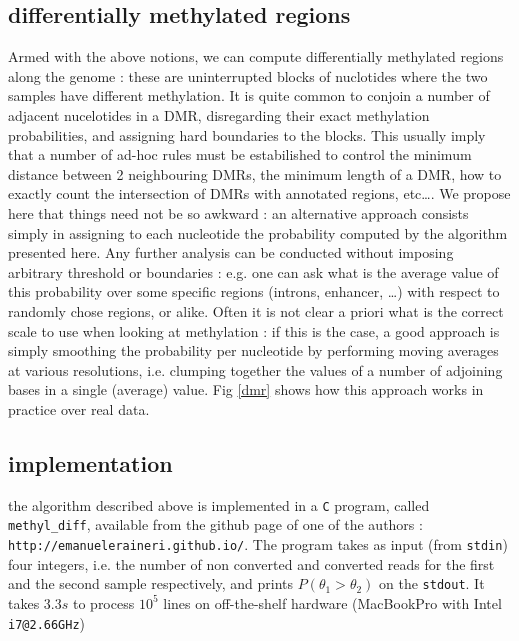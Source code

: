 \documentclass[11pt]{amsart}
\begin{document}
\subsection{differentially methylated regions}
Armed with the above notions, we can compute differentially methylated regions along the genome : these are uninterrupted blocks of nuclotides where the two samples have different methylation. It is quite common to conjoin a number of adjacent nucelotides in a DMR, disregarding their exact methylation probabilities, and assigning hard boundaries to the blocks. This usually imply that a number of ad-hoc rules must be estabilished to control the minimum distance between 2 neighbouring DMRs, the minimum length of a DMR, how to exactly count the intersection of DMRs with annotated regions, etc\dots. We propose here that things need not be so awkward : an alternative approach consists simply in assigning to each nucleotide the probability computed by the algorithm presented here. Any further analysis can be conducted without imposing arbitrary threshold or boundaries : e.g. one can ask what is the average value of this probability over some specific regions (introns, enhancer, \dots) with respect to randomly chose regions, or alike. Often it is not clear a priori what is the correct scale to use when looking at methylation : if this is the case, a good approach is simply smoothing the probability per nucleotide by performing moving averages at various resolutions, i.e. clumping together the values of a number of adjoining bases in a single (average) value. Fig \ref{dmr} shows how this approach works in practice over real data.
\subsection{implementation}
the algorithm described above is implemented in a \verb=C= program, called \verb=methyl_diff=, available from the github page of one of the authors : \verb=http://emanueleraineri.github.io/=. The program takes as input (from \verb=stdin=) four integers, i.e. the number of non converted and converted reads for the first and the second sample respectively, and prints $P(\theta_1>\theta_2)$ on the \verb=stdout=. It takes $3.3s$ to process $10^5$ lines on off-the-shelf hardware (MacBookPro with Intel \verb=i7@2.66GHz=) 


\end{document}
